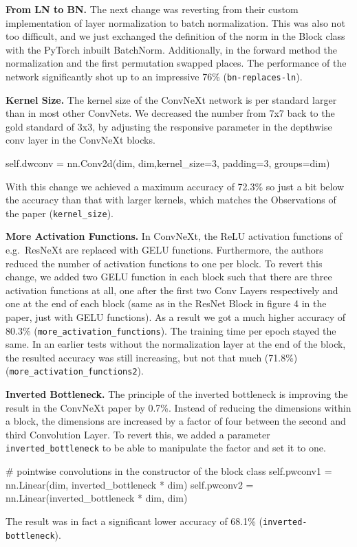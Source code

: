 \documentclass{article}
\begin{document}
\textbf{From LN to BN.} %
The next change was reverting from their custom implementation of layer normalization to batch normalization.
This was also not too difficult, and we just exchanged the definition of the norm in the Block class with the PyTorch inbuilt BatchNorm.
Additionally, in the forward method the normalization and the first permutation swapped places.
The performance of the network significantly shot up to an impressive 76\% (\texttt{bn-replaces-ln}).

\textbf{Kernel Size.} %
The kernel size of the ConvNeXt network is per standard larger than in most other ConvNets.
We decreased the number from 7x7 back to the gold standard of 3x3, by adjusting the responsive parameter in the depthwise conv layer in the ConvNeXt blocks.
\begin{python}
self.dwconv = nn.Conv2d(dim, dim,kernel_size=3, padding=3, groups=dim)
\end{python}
With this change we achieved a maximum accuracy of 72.3\% so just a bit below the accuracy than that with larger kernels, which matches the Observations of the paper (\texttt{kernel\_size}).

\textbf{More Activation Functions.} %
In ConvNeXt, the ReLU activation functions of e.g.\ ResNeXt are replaced with GELU functions.
Furthermore, the authors reduced the number of activation functions to one per block.
To revert this change, we added two GELU function in each block such that there are three activation functions at all, one after the first two Conv Layers respectively and one at the end of each block (same as in the ResNet Block in figure 4 in the paper, just with GELU functions).
As a result we got a much higher accuracy of 80.3\% (\texttt{more\_activation\_functions}).
The training time per epoch stayed the same.
In an earlier tests without the normalization layer at the end of the block, the resulted accuracy was still increasing, but not that much (71.8\%) (\texttt{more\_activation\_functions2}).

\textbf{Inverted Bottleneck.} %
The principle of the inverted bottleneck is improving the result in the ConvNeXt paper by 0.7\%.
Instead of reducing the dimensions within a block, the dimensions are increased by a factor of four between the second and third Convolution Layer.
To revert this, we added a parameter \texttt{inverted\_bottleneck}
to be able to manipulate the factor and set it to one.
\begin{python}
# pointwise convolutions in the constructor of the block class
self.pwconv1 = nn.Linear(dim, inverted_bottleneck * dim)
self.pwconv2 = nn.Linear(inverted_bottleneck * dim, dim)
\end{python}
The result was in fact a significant lower accuracy of 68.1\% (\texttt{inverted-bottleneck}).
\end{document}
